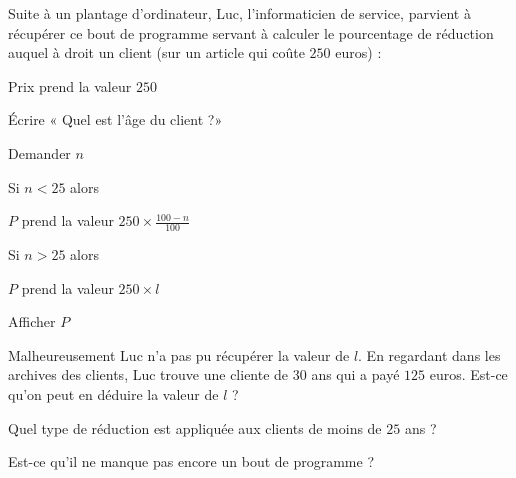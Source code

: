 
\begin{exercice}\label{exosmath-0555}

Suite à un plantage d'ordinateur, Luc, l'informaticien de service, parvient à récupérer ce bout de programme servant à calculer le pourcentage de réduction auquel à droit un client (sur un article qui coûte \( 250\) euros) :
\begin{fmpage}{0.9\linewidth}

    Prix prend la valeur \( 250\)

    Écrire « Quel est l'âge du client ?» 

    Demander \( n\)

    Si \( n < 25\) alors

    \hspace{1cm} \( P\) prend la valeur \( 250\times \frac{ 100-n }{ 100 }\)

    Si \( n > 25 \) alors

    \hspace{1cm} \( P\) prend la valeur \( 250\times l\)

    Afficher \( P\)

\end{fmpage}

Malheureusement Luc n'a pas pu récupérer la valeur de \( l\). En regardant dans les archives des clients, Luc trouve une cliente de \( 30\) ans qui a payé \( 125\) euros. Est-ce qu'on peut en déduire la valeur de \( l\) ?

Quel type de réduction est appliquée aux clients de moins de \( 25\) ans ?

Est-ce qu'il ne manque pas encore un bout de programme ?

\end{exercice}
